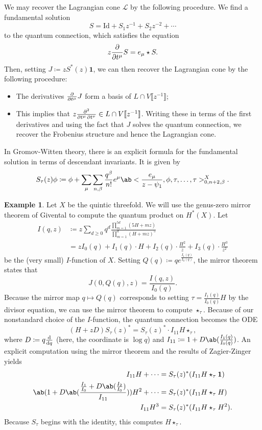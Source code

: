 \documentclass[10pt,oldfontcommands,oneside]{memoir}
\theoremstyle{definition}
\newtheorem{exm}[thm]{Example}
\theoremstyle{remark}
\theoremstyle{plain}
\theoremstyle{definition}
\theoremstyle{remark}
\newcommand{\mc}[1]{\mathcal{#1}}
\newcommand{\mr}[1]{\mathrm{#1}}
\newcommand{\1}{\mathbf{1}}
\newcommand{\2}{\mathbf{2}}
\newcommand{\3}{\mathbf{3}}
\newcommand{\ps}[1]{\llbracket #1 \rrbracket}
\begin{document}
We may recover the Lagrangian cone $\mc{L}$ by the following procedure. We find a fundamental solution 
\[ S = \mr{Id} + S_1 z^{-1} + S_2 z^{-2} + \cdots \]
to the quantum connection, which satisfies the equation
\[ z \pdv{}{t^{\mu}}S = e_{\mu} \star S. \]
Then, setting $J \coloneqq z S^*(z) \1$, we can then recover the Lagrangian cone by the following procedure:
\begin{itemize}
    \item The derivatives $\pdv{}{t^{\mu}} J$ form a basis of $L \cap V\ps{z^{-1}}$;
    \item This implies that $z \pdv{}{t^{\mu},t^{\nu}} \in L \cap V \ps{z^{-1}}$. Writing these in terms of the first derivatives and using the fact that $J$ solves the quantum connection, we recover the Frobenius structure and hence the Lagrangian cone.
\end{itemize}

In Gromov-Witten theory, there is an explicit formula for the fundamental solution in terms of descendant invariants. It is given by
\[ S_{\tau}(z) \phi \coloneqq \phi + \sum_{\mu} \sum_{n,\beta} \frac{q^{\beta}}{n!} e^{\mu} \ab<\frac{e_{\mu}}{z-\psi_1}, \phi, \tau, \ldots, \tau>_{0,n+2,\beta}^{X}. \]

\begin{exm}
    Let $X$ be the quintic threefold. We will use the genus-zero mirror theorem of Givental to compute the quantum product on $H^*(X)$. Let
    \begin{align*}
        I(q,z) &\coloneqq z \sum_{d \geq 0} q^d \frac{\prod_{m=1}^{5d} (5H+mz)}{\prod_{m=1}^d (H+mz)^5}  \\
        &= z I_0(q) + I_1(q) \cdot H + I_2(q) \cdot \frac{H^2}{z} + I_3(q) \cdot \frac{H^3}{z^2}
    \end{align*}
    be the (very small) $I$-function of $X$. Setting $Q(q) \coloneqq q e^{\frac{I_1(q)}{I_0(q)}}$, the mirror theorem states that
    \[ J(0,Q(q),z) = \frac{I(q,z)}{I_0(q)}. \]
    Because the mirror map $q \mapsto Q(q)$ corresponds to setting $\tau = \frac{I_1(q)}{I_0(q)} H$ by the divisor equation, we can use the mirror theorem to compute $\star_{\tau}$. Because of our nonstandard choice of the $I$-function, the quantum connection becomes the ODE
    \[ (H+zD) S_{\tau}(z)^* = S_{\tau}(z)^* \cdot I_{11} H \star_{\tau}, \]
    where $D \coloneqq q \odv{}{q}$ (here, the coordinate is $\log q$) and $I_{11} \coloneqq 1 + D \ab(\frac{I_1(q)}{I_0(q)})$. An explicit computation using the mirror theorem and the results of Zagier-Zinger~\cite{zagierzinger} yields
    \begin{align*}
        I_{11} H + \cdots &= S_{\tau}(z)^* (I_{11} H \star_{\tau} \1) \\
        \ab( 1 + D\ab(\frac{\frac{I_1}{I_0} + D \ab(\frac{I_2}{I_0})}{I_{11}}) ) H^2 + \cdots &= S_{\tau}(z)^* (I_{11} H \star_{\tau} H) \\
        I_{11} H^3 &= S_{\tau}(z)^* (I_{11}H \star_{\tau} H^2).
    \end{align*}
    Because $S_{\tau}$ begins with the identity, this computes $H \star_{\tau}$.
\end{exm}
\end{document}
